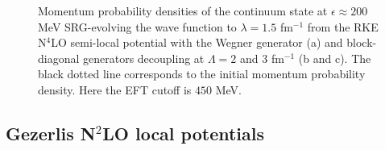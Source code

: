 \documentclass[preprintnumbers,floatfix,aps,prc,preprint,nofootinbib]{revtex4-1}
\begin{document}
\begin{figure}[H]
	\centering
	\quad
	\quad
	\caption{Momentum probability densities of the continuum state at $\epsilon \approx 200$ MeV SRG-evolving the wave function to $\lambda=1.5$ fm$^{-1}$ from the RKE N$^4$LO semi-local potential with the Wegner generator (a) and block-diagonal generators decoupling at $\Lambda=2$ and $3$ fm$^{-1}$ (b and c). The black dotted line corresponds to the initial momentum probability density. Here the EFT cutoff is $450$ MeV.}
	\label{continuum_state_momentum_distribution_eps200,0_kvnn111}
\end{figure}


\subsection{Gezerlis N$^2$LO local potentials}
\label{sec:local_results}
\end{document}
